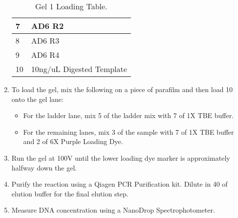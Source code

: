 \documentclass{ssiBio}
\begin{document}
\begin{enumerate}
\begin{table}[ht]
\begin{tabular}{|l|l|}
    7 & AD6 R2 \\ \hline
    8 & AD6 R3 \\ \hline
    9 & AD6 R4 \\ \hline
    10 & 10ng/uL Digested Template \\ \hline
    \end{tabular}
    \caption{\label{tab:gel-1-table}Gel 1 Loading Table.}
    \end{table}
  \item{To load the gel, mix the following on a piece of parafilm and then load 10\uL{} onto the gel lane:}
  \begin{itemize}
    \item{For the ladder lane, mix 5\uL{} of the ladder mix with 7\uL{} of 1X TBE buffer.}
    \item{For the remaining lanes, mix 3\uL{} of the sample with 7\uL{} of 1X TBE buffer and 2\uL{} of 6X Purple Loading Dye.}
  \end{itemize}
  \item{Run the gel at 100V until the lower loading dye marker is approximately halfway down the gel.}
  \stopPoint{}
  \item{Purify the reaction using a Qiagen PCR Purification kit. Dilute in 40 \uL{} of elution buffer for the final elution step.}
  \item{Measure DNA concentration using a NanoDrop Spectrophotometer.}
  \stopPoint{}
\end{enumerate}
\end{document}

